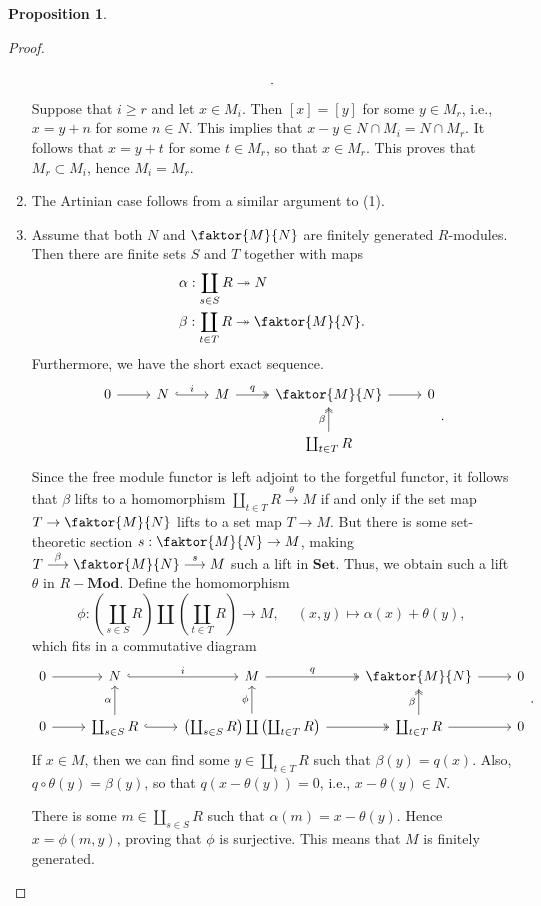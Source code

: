 \documentclass[10pt,letterpaper,cm]{nupset}
\theoremstyle{definition}
\theoremstyle{theorem}
\newtheorem{prop}[definition]{Proposition}
\theoremstyle{remark}
\newcommand{\1}{\mathbf{1}}
\newcommand{\0}{\vec 0}
\begin{document}
\begin{prop}
\begin{proof}
\begin{enumerate}[label=(\arabic*)]
\[\begin{tikzcd}
\end{tikzcd}.
\]
Suppose that $i\geq r$ and let $x \in M_i$. Then $\left[x\right] = \left[y\right]$ for some $y\in M_r$, i.e., $x = y+n$ for some $n\in N$. This implies that $x-y \in N \cap M_i = N \cap M_r$. It follows that $x = y+t$ for some $t\in M_r$, so that $x\in M_r$. This proves that $M_r\subset M_i$, hence $M_i = M_r$.
\item The Artinian case follows from a similar argument to (1).
\item Assume that both $N$ and $\faktor{M}{N}$ are finitely generated $R$-modules. Then there are finite sets $S$ and $T$ together with maps
\begin{align*}
& \alpha: \coprod_{s\in S}R \twoheadrightarrow N  \\
& \beta : \coprod_{t\in T} R \twoheadrightarrow \faktor{M}{N}.
\end{align*}
Furthermore, we have the short exact sequence.
\[\begin{tikzcd}
0 \arrow[r] & N \arrow[r, "i", hook] & M \arrow[r, "q", two heads] & \faktor{M}{N} \arrow[r] & 0 \\
 &  &  & \coprod_{t\in T}R \arrow[u, "\beta", two heads] & 
\end{tikzcd}
.\]
Since the free module functor is left adjoint to the forgetful functor, it follows that $\beta$ lifts to a homomorphism $ \coprod_{t\in T}R \overset{\theta}{\longrightarrow} M$  if and only if the set map $T \to \faktor{M}{N}$ lifts to a set map $T \to M$. But there is some set-theoretic section $s: \faktor{M}{N} \to M$, making $T \overset{\beta}{\longrightarrow} \faktor{M}{N} \overset{s}{\longrightarrow} M$ such a lift in $\mathbf{Set}$. Thus, we obtain such a lift $\theta$ in $R{-}\mathbf{Mod}$. Define the homomorphism $$\phi : \left(\coprod_{s\in S} R\right) \coprod \left(\coprod_{t\in T} R\right)\to M,\ \quad (x,y) \mapsto \alpha(x) + \theta(y),$$ which fits in a commutative diagram
\[
\begin{tikzcd}
0 \arrow[r] & N \arrow[r, "i", hook] & M \arrow[r, "q", two heads] & \faktor{M}{N} \arrow[r] & 0 \\
0 \arrow[r] & \coprod_{s\in S}R \arrow[u, "\alpha"] \arrow[r, hook] & \left(\coprod_{s\in S} R\right) \coprod \left(\coprod_{t\in T} R\right) \arrow[u, "\phi"] \arrow[r, two heads] & \coprod_{t\in T}R \arrow[u, "\beta", two heads] \arrow[r] & 0
\end{tikzcd}.
\] 
If $x\in M$, then we can find some $y\in \coprod_{t\in T}R$ such that $\beta(y) = q(x)$. Also, $q\circ \theta(y) = \beta(y)$, so that $q(x- \theta(y) ) = 0$, i.e., $x-\theta(y) \in N$. 

There is some $m\in \coprod_{s\in S}R$ such that $\alpha(m) = x-\theta(y)$. Hence $x= \phi(m,y)$, proving that $\phi$ is surjective. This means that $M$ is finitely generated.
\end{enumerate}
\end{proof}
\end{prop}
\end{document}
